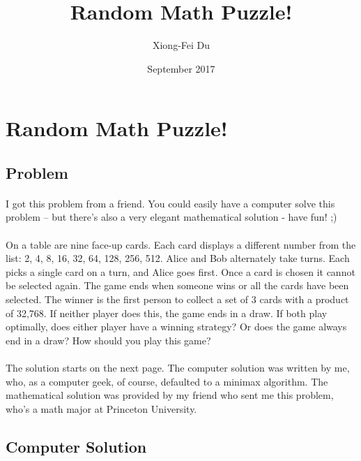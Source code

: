 \documentclass{article}
\title{Random Math Puzzle!}
\author{Xiong-Fei Du}
\date{September 2017}
\begin{document}

\section{Random Math Puzzle!}

\subsection{Problem}

\paragraph{} I got this problem from a friend. You could easily have a computer solve this problem -- but there's also a very elegant mathematical solution - have fun! ;)

\paragraph{} On a table are nine face-up cards. Each card displays a different number from the list: 2, 4, 8, 16, 32, 64, 128, 256, 512. Alice and Bob alternately take turns. Each picks a single card on a turn, and Alice goes first. Once a card is chosen it cannot be selected again. The game ends when someone wins or all the cards have been selected. The winner is the first person to collect a set of 3 cards with a product of 32,768. If neither player does this, the game ends in a draw. If both play optimally, does either player have a winning strategy? Or does the game always end in a draw? How should you play this game?

\paragraph{} The solution starts on the next page. The computer solution was written by me, who, as a computer geek, of course, defaulted to a minimax algorithm. The mathematical solution was provided by my friend who sent me this problem, who's a math major at Princeton University.

\newpage

\subsection{Computer Solution}
\end{document}
